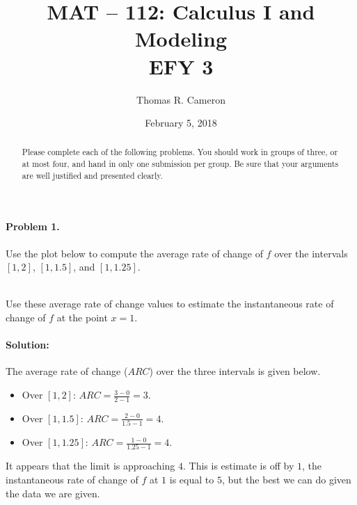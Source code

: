 \documentclass{article}
\title{MAT -- 112: Calculus I and Modeling\\
\large{EFY 3}}
\author{Thomas R. Cameron}
\date{February 5, 2018}
\begin{document}
\maketitle

\begin{abstract}
Please complete each of the following problems. You should work in groups of three, or at most four, and hand in only one submission per group. Be sure that your arguments are well justified and presented clearly. 
\end{abstract}

\paragraph*{Problem 1.}	Use the plot below to compute the average rate of change of $f$ over the intervals $[1,2]$, $[1,1.5]$, and $[1,1.25]$.
\begin{figure}[h]
\centering
{}
\end{figure}~\\
Use these average rate of change values to estimate the instantaneous rate of change of $f$ at the point $x=1$. 

\paragraph*{Solution:} The average rate of change ($ARC$) over the three intervals is given below.
\begin{itemize}
\item	Over $[1,2]$: $ARC=\frac{3-0}{2-1}=3$.
\item	Over $[1,1.5]$: $ARC=\frac{2-0}{1.5-1}=4$.
\item Over $[1,1.25]$: $ARC=\frac{1-0}{1.25-1}=4$. 
\end{itemize}
It appears that the limit is approaching $4$. This is estimate is off by $1$, the instantaneous rate of change of $f$ at $1$ is equal to $5$, but the best we can do given the data we are given. 
\end{document}
